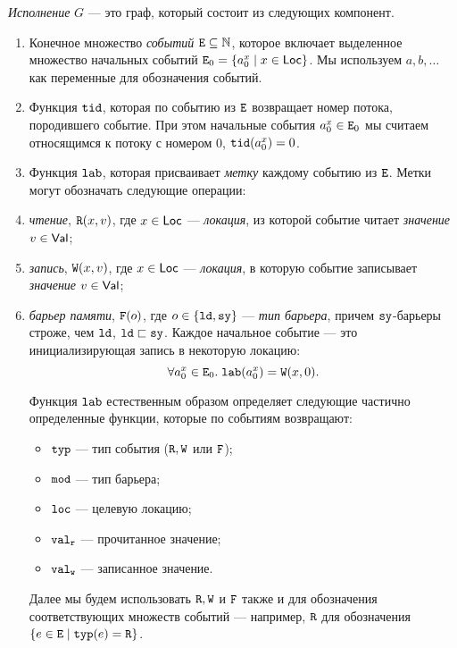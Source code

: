 \begin{definition}
\label{def:execution}
\emph{Исполнение} $G$ --- это граф, который состоит из следующих компонент.
\begin{enumerate}
\item Конечное множество \emph{событий} $\lE \suq \mathbb{N}$, которое включает
      выделенное множество начальных событий $\lE_0 = \{ a^x_0 \suchthat x \in \Loc \}$.
      Мы используем $a,b,\ldots$ как переменные для обозначения событий.

\item Функция $\lTID$, которая по событию из $\lE$  возвращает номер потока, породившего событие.
      При этом начальные события $a^x_0 \in \lE_0$ мы считаем относящимся к потоку с номером 0,
      $\lTID(a^x_0) = 0$.

\item Функция $\lLAB$, которая присваивает \emph{метку} каждому событию из $\lE$.
      Метки могут обозначать следующие операции:
\squishlist
\item \emph{чтение}, $\evlab{\lR}{o}{x}{v}$, где $x\in\Loc$ ---
  \emph{локация}, из которой событие читает \emph{значение} $v\in\Val$;
\item \emph{запись}, $\evlab{\lW}{o}{x}{v}$, где $x\in\Loc$ ---
  \emph{локация}, в которую событие записывает \emph{значение} $v\in\Val$;
\item \emph{барьер памяти}, $\flab{o}$, где $o\in \{\ld,\full\}$ --- \emph{тип барьера}, причем $\full$-барьеры строже, чем
  $\ld$, $\ld \sqsu \full$.
\squishend
Каждое начальное событие --- это инициализирующая запись в некоторую локацию:
\[\forall a^x_0 \in \lE_0. \; \lLAB(a^x_0) = \evlab{\lW}{\pln}{x}{0}.\]

Функция $\lLAB$ естественным образом определяет следующие частично определенные функции, которые
по событиям возвращают:
\begin{itemize}
  \item $\lTYP$ --- тип события ($\lR,\lW$ или $\lF$);
  \item $\lMOD$ --- тип барьера;
  \item $\lLOC$ --- целевую локацию;
  \item $\lVALR$ --- прочитанное значение;
  \item $\lVALW$ --- записанное значение.
\end{itemize}
Далее мы будем использовать $\lR, \lW$ и $\lF$ также и для обозначения соответствующих множеств
событий --- например, $\lR$ для обозначения $\{e\in \lE \suchthat \lTYP(e)=\lR\}$.


\end{enumerate}
\end{definition}
